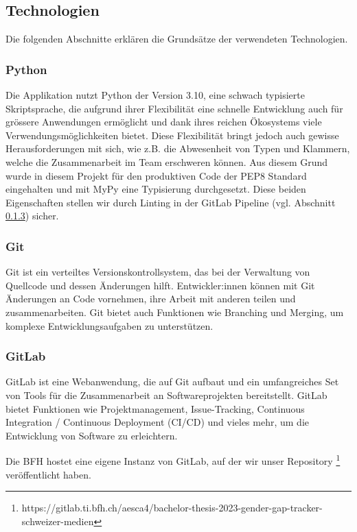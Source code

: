 \subsection{Technologien}

Die folgenden Abschnitte erklären die Grundsätze der verwendeten Technologien.

\subsubsection{Python}
Die Applikation nutzt Python der Version 3.10, eine schwach typisierte 
Skriptsprache, die aufgrund ihrer Flexibilität eine schnelle Entwicklung
auch für grössere Anwendungen ermöglicht und dank ihres reichen Ökosystems
viele Verwendungsmöglichkeiten bietet. Diese Flexibilität bringt jedoch
auch gewisse Herausforderungen mit sich, wie z.B. die Abwesenheit von
Typen und Klammern, welche die
Zusammenarbeit im Team erschweren können. Aus diesem Grund wurde in
diesem Projekt für den produktiven Code der PEP8 Standard eingehalten und mit MyPy
eine Typisierung durchgesetzt. Diese beiden Eigenschaften stellen wir
durch Linting in der GitLab Pipeline (vgl. Abschnitt \ref{gitlab}) sicher.

\subsubsection{Git}
Git ist ein verteiltes Versionskontrollsystem, das bei der Verwaltung
von Quellcode und dessen Änderungen hilft. Entwickler:innen können mit
Git Änderungen an Code vornehmen, ihre Arbeit mit anderen teilen und
zusammenarbeiten. Git bietet auch Funktionen wie Branching und Merging,
um komplexe Entwicklungsaufgaben zu unterstützen. 

\subsubsection{GitLab}\label{gitlab}
GitLab ist eine Webanwendung, die auf Git aufbaut und ein umfangreiches
Set von Tools für die Zusammenarbeit an Softwareprojekten bereitstellt.
GitLab bietet Funktionen wie Projektmanagement, Issue-Tracking,
Continuous Integration / Continuous Deployment (CI/CD) und vieles mehr,
um die Entwicklung von Software zu erleichtern.

Die BFH hostet eine eigene Instanz von GitLab, auf der wir unser Repository
\footnote{https://gitlab.ti.bfh.ch/aesca4/bachelor-thesis-2023-gender-gap-tracker-schweizer-medien}
veröffentlicht haben.

